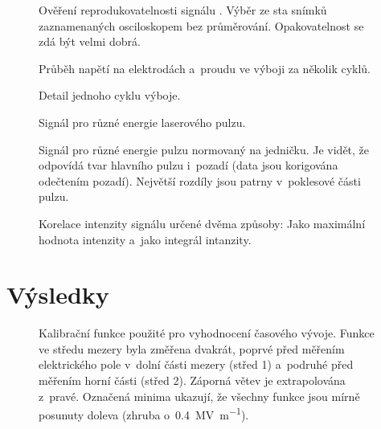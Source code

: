 \begin{figure}[htp]
	\centering
	
	\caption{Ověření reprodukovatelnosti signálu \EFISH{}.
		Výběr ze sta snímků zaznamenaných osciloskopem bez průměrování.
		Opakovatelnost se zdá být velmi dobrá.}
	\label{fig:efish-singleshots-compare}
\end{figure}

\begin{figure}[htp]
	\centering
	
	\caption{Průběh napětí na elektrodách a~proudu ve výboji
		za několik cyklů.}
	\label{fig:efish-overview-full}
	\vspace{24pt}
	
	\caption{Detail jednoho cyklu výboje.}
	\label{fig:efish-overview-period}
\end{figure}

\begin{figure}[htp]
	\centering
	
	\caption{Signál \EFISH{} pro různé energie laserového pulzu.}
	\label{fig:efish-energy-corrected}
	\vspace{24pt}
	
	\caption{Signál \EFISH{} pro různé energie pulzu normovaný na jedničku.
		Je vidět, že odpovídá tvar hlavního pulzu i~pozadí
		(data jsou korigována odečtením pozadí).
		Největší rozdíly jsou patrny v~poklesové části pulzu.}
	\label{fig:efish-energy-norm}
\end{figure}

\begin{figure}[htp]
	\centering
	
	\caption{Korelace intenzity signálu \EFISH{} určené dvěma způsoby:
		Jako maximální hodnota intenzity a~jako integrál intanzity.}
	\label{fig:efish-intmax}
\end{figure}

\section{Výsledky}
\label{sec:efish-results}

\begin{figure}
	\centering
	
	\caption{Kalibrační funkce použité pro vyhodnocení časového vývoje.
		Funkce ve středu mezery byla změřena dvakrát, poprvé před měřením
		elektrického pole v~dolní části mezery (střed 1)
		a~podruhé před měřením horní části (střed 2).
		Záporná větev je extrapolována z~pravé.
		Označená minima ukazují, že všechny funkce jsou mírně posunuty
		doleva (zhruba o~\SI{0.4}{\mega\volt\per\metre}).}
	\label{fig:efish-period-calib}
\end{figure}

